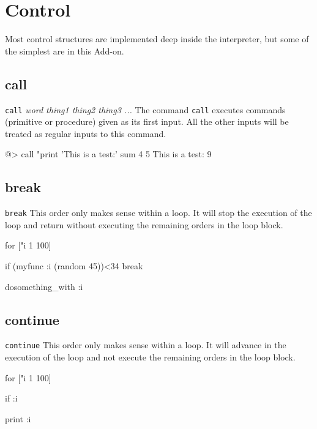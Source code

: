 \section{Control} 
 
Most control structures are implemented deep inside the interpreter, but some of the simplest are in this Add-on. 
 
\subsection*{call}  
 
{\tt call} {\it word thing1 thing2 thing3 ...} 
\newline\newline 
The command {\tt call} executes commands (primitive or procedure) given as its first input. All the other inputs will be treated as regular inputs to this command. 
\begin{verbatimtab} 
@> call "print 'This is a test:' sum 4 5
This is a test: 9
\end{verbatimtab}
 
\subsection*{break}  
 
{\tt break} 
\newline\newline 
This order only makes sense within a loop. It will stop the execution of the loop and return without executing the remaining orders in the loop block. 
\begin{verbatimtab} 
for ["i 1 100] { 
 
	if (myfunc :i (random 45))<34 {break} 
 
	dosomething_with :i 
}
\end{verbatimtab}
 
\subsection*{continue}  
 
{\tt continue} 
\newline\newline 
This order only makes sense within a loop. It will advance in the execution of the loop and not execute the remaining orders in the loop block. 
\begin{verbatimtab} 
for ["i 1 100] { 
 
	if :i%
 
	print :i 
} 
\end{verbatimtab}
 
